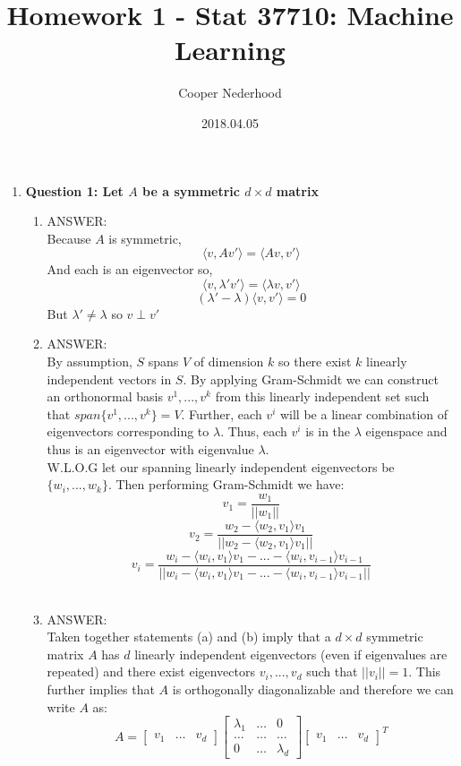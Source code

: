 \documentclass[a4paper, 12pt]{article}
\begin{document}
\title{Homework 1 - Stat 37710: Machine Learning}
\author{Cooper Nederhood}
\date{2018.04.05}
\maketitle

\begin{enumerate}
\item \textbf{Question 1: Let $A$ be a symmetric $d \times d$ matrix}


	\begin{enumerate}
	\item ANSWER:
	\\
	Because $A$ is symmetric, 
	$$\langle v, Av' \rangle = \langle Av, v' \rangle$$
	And each is an eigenvector so,
	$$\langle v, \lambda'v' \rangle  =  \langle \lambda v, v' \rangle  $$
	$$ (\lambda' - \lambda) \langle v, v' \rangle   = 0 $$
	But $ \lambda' \ne \lambda $ so $v \perp v'$
	\\

	\item ANSWER:
	\\
	By assumption, $S$ spans $V$ of dimension $k$ so there exist $k$ linearly independent vectors in $S$. By applying Gram-Schmidt we can construct an orthonormal basis $v^1, ... , v^k$ from this linearly independent set such that $span\{v^1, ... , v^k\} = V$. Further, each $v^i$ will be a linear combination of eigenvectors corresponding to $\lambda$. Thus, each $v^i$ is in the $\lambda$ eigenspace and thus is an eigenvector with eigenvalue $\lambda$. 
	\\ W.L.O.G let our spanning linearly independent eigenvectors be $\{w_i, ... , w_k \}$. Then performing Gram-Schmidt we have:
	$$ v_1 = \frac{w_1}{||w_1||} $$
	$$ v_2 = \frac{w_2 - \langle w_2, v_1 \rangle v_1 }{||w_2 - \langle w_2, v_1 \rangle v_1 ||} $$
	$$ v_i = \frac{w_i - \langle w_i, v_1 \rangle v_1 - ... - \langle w_i, v_{i-1} \rangle v_{i-1} }{||w_i - \langle w_i, v_1 \rangle v_1 - ... - \langle w_i, v_{i-1} \rangle v_{i-1} ||} $$	
	\\

	\item ANSWER:
	\\
	Taken together statements (a) and (b) imply that a $d \times d$ symmetric matrix $A$ has $d$ linearly independent eigenvectors (even if eigenvalues are repeated) and there exist eigenvectors $v_i, ... , v_d$ such that $||v_i|| = 1$. This further implies that $A$ is orthogonally diagonalizable and therefore we can write $A$ as:
	$$ A = \left [\begin{array}{ccc} v_1 & \dots & v_d \end{array}\right]              
	 \left[ \begin{array}{ccc} \lambda_1 & \dots & 0\\   \dots & \dots & \dots \\   0 & \dots & \lambda_d \end{array}\right]  \left [\begin{array}{ccc} v_1 & \dots & v_d \end{array}\right]^T$$


\end{enumerate}
\end{enumerate}
\end{document}
